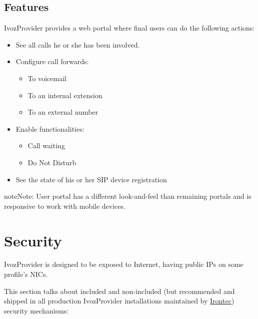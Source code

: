 \documentclass[letterpaper,10pt,english]{sphinxmanual}
\begin{document}
\section{Features}
\label{user_portal/features::doc}\label{user_portal/features:features}
IvozProvider provides a web portal where final users can do the following
actions:
\begin{itemize}
\item {} 
See all calls he or she has been involved.

\item {} 
Configure call forwards:
\begin{itemize}
\item {} 
To voicemail

\item {} 
To an internal extension

\item {} 
To an external number

\end{itemize}

\item {} 
Enable functionalities:
\begin{itemize}
\item {} 
Call waiting

\item {} 
Do Not Disturb

\end{itemize}

\item {} 
See the state of his or her SIP device registration

\end{itemize}

\begin{notice}{note}{Note:}
User portal has a different look-and-feel than remaining portals and is responsive to work with mobile devices.
\end{notice}


\chapter{Security}
\label{security_and_maintenance/security/index:security}\label{security_and_maintenance/security/index::doc}\label{security_and_maintenance/security/index:id1}
IvozProvider is designed to be exposed to Internet, having public IPs on some profile's NICs.

This section talks about included and non-included (but recommended and shipped in all production IvozProvider
installations maintained by \href{https://www.irontec.com}{Irontec}) security mechanisms:
\end{document}
